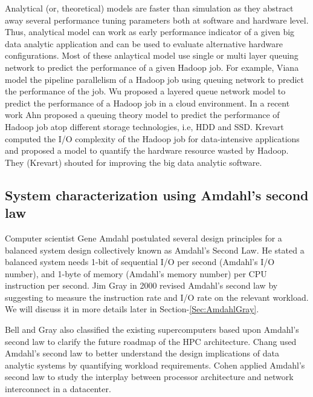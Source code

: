 \documentclass[journal]{IEEEtran}
\begin{document}
Analytical (or, theoretical) models are faster than simulation as they abstract away several performance tuning parameters both at software and hardware level. Thus, analytical model can work as early performance indicator of a given big data analytic application and can be used to evaluate alternative hardware configurations. Most of these anlaytical model use single or multi layer queuing network to predict the performance of a given Hadoop job. For example, Viana \cite{Model:vianna2013analytical} model the pipeline parallelism of a Hadoop job using queuing network to predict the performance of the job.  Wu \cite{Model:wu2015exploring} proposed a layered queue network model to predict the performance of a Hadoop job in a cloud environment. In a recent work Ahn \cite{Model:ahn2015analytical} proposed a queuing theory model to predict the performance of Hadoop job atop different storage technologies, i.e, HDD and SSD. Krevart \cite{Model:krevat2010applying} computed the I/O complexity of the Hadoop job for data-intensive applications and proposed a model to quantify the hardware resource wasted by Hadoop.  They (Krevart) shouted for improving the big data analytic software.

\subsection{System characterization using Amdahl's second law }
Computer scientist Gene Amdahl postulated several design principles for a balanced system design collectively known as Amdahl's Second Law. He stated a balanced system needs 1-bit of sequential I/O per second (Amdahl's I/O number), and 1-byte of memory (Amdahl's memory number) per CPU instruction per second. Jim Gray \cite{Amdahl:RuleofThumbgray2000rules} in 2000 revised Amdahl's second law by suggesting to measure the instruction rate and I/O rate on the relevant workload. We will discuss it in more details later in Section-\ref{Sec:AmdahlGray}.

Bell and Gray \cite{Amdahl:PetascaleBell2005petascale} also classified the existing supercomputers based upon Amdahl's second law to clarify the future roadmap of the HPC architecture. Chang  \cite{Amdahl:Workloadchang} used Amdahl's second law to better understand the design implications of data analytic systems by quantifying workload requirements.  Cohen \cite{Balance:cohen2009applying} applied Amdahl’s second law to study the interplay between processor architecture and network interconnect in a datacenter. 
\end{document}
